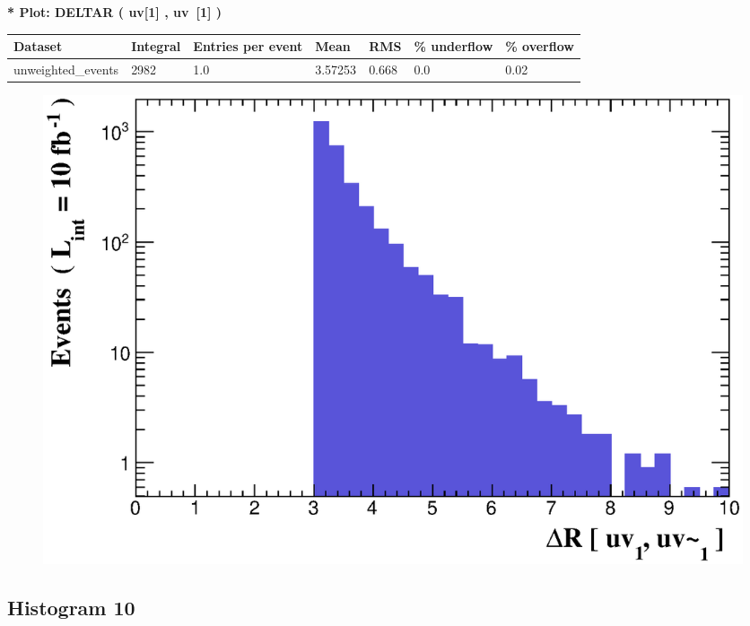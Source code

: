 \documentclass[a4paper, 10pt]{article}
\begin{document}
\textbf{* Plot: DELTAR ( uv[1] , uv~[1] ) }\\
   \begin{table}[H]
  \begin{center}
    \begin{tabular}{|m{23.0mm}|m{23.0mm}|m{18.0mm}|m{19.0mm}|m{19.0mm}|m{19.0mm}|m{19.0mm}|}
      \hline
      {\cellcolor{yellow}         Dataset}& {\cellcolor{yellow}         Integral}& {\cellcolor{yellow}         Entries per event}& {\cellcolor{yellow}         Mean}& {\cellcolor{yellow}         RMS}& {\cellcolor{yellow}         \% underflow}& {\cellcolor{yellow}         \% overflow}\\
      \hline
      {\cellcolor{white}         unweighted\_events}& {\cellcolor{white}         2982}& {\cellcolor{white}         1.0}& {\cellcolor{white}         3.57253}& {\cellcolor{white}         0.668}& {\cellcolor{green}         0.0}& {\cellcolor{green}         0.02}\\
\hline
    \end{tabular}
  \end{center}
\end{table}

\begin{figure}[H]
  \begin{center}
    \includegraphics[scale=0.45]{selection_8.eps}\\
\caption{   }
  \end{center}
\end{figure}
      \newpage
\subsection{ Histogram 10}
\end{document}
